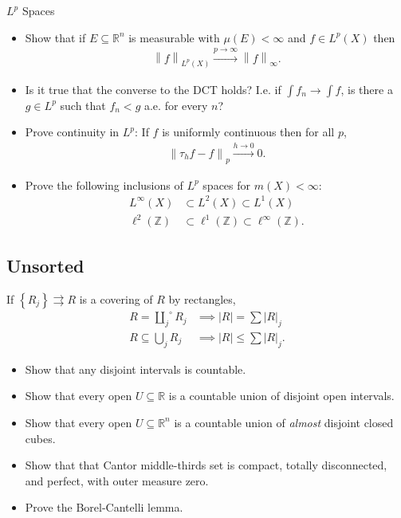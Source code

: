 \(L^p\) Spaces

\begin{itemize}
\tightlist
\item
  Show that if \(E\subseteq {\mathbb{R}}^n\) is measurable with
  \(\mu(E) < \infty\) and \(f\in L^p(X)\) then
  \begin{align*}{\left\lVert {f} \right\rVert}_{L^p(X)} \overset{p\to\infty}\to {\left\lVert {f} \right\rVert}_\infty.\end{align*}
\item
  Is it true that the converse to the DCT holds? I.e. if
  \(\int f_n \to \int f\), is there a \(g\in L^p\) such that \(f_n < g\)
  a.e. for every \(n\)?
\item
  Prove continuity in \(L^p\): If \(f\) is uniformly continuous then for
  all \(p\),
  \begin{align*}{\left\lVert {\tau_h f - f} \right\rVert}_p \overset{h\to 0}\to 0.\end{align*}
\item
  Prove the following inclusions of \(L^p\) spaces for
  \(m(X) < \infty\):
  \begin{align*}
  L^\infty(X) &\subset L^2(X) \subset L^1(X) \\
  \ell^2({\mathbb{Z}}) &\subset \ell^1({\mathbb{Z}}) \subset \ell^\infty({\mathbb{Z}})
  .\end{align*}
\end{itemize}

\hypertarget{unsorted}{%
\subsection{Unsorted}\label{unsorted}}

\begin{proposition}

If \(\left\{{R_j}\right\} \rightrightarrows R\) is a covering of \(R\)
by rectangles,
\begin{align*}
R = \overset{\circ}{\displaystyle\coprod_{j}} R_j &\implies {\left\lvert {R} \right\rvert} = \sum {\left\lvert {R} \right\rvert}_j \\
R \subseteq \displaystyle\bigcup_j R_j &\implies {\left\lvert {R} \right\rvert} \leq \sum {\left\lvert {R} \right\rvert}_j
.\end{align*}

\end{proposition}

\begin{itemize}
\tightlist
\item
  Show that any disjoint intervals is countable.
\item
  Show that every open \(U \subseteq {\mathbb{R}}\) is a countable union
  of disjoint open intervals.
\item
  Show that every open \(U \subseteq {\mathbb{R}}^n\) is a countable
  union of \emph{almost} disjoint closed cubes.
\item
  Show that that Cantor middle-thirds set is compact, totally
  disconnected, and perfect, with outer measure zero.
\item
  Prove the Borel-Cantelli lemma.
\end{itemize}

